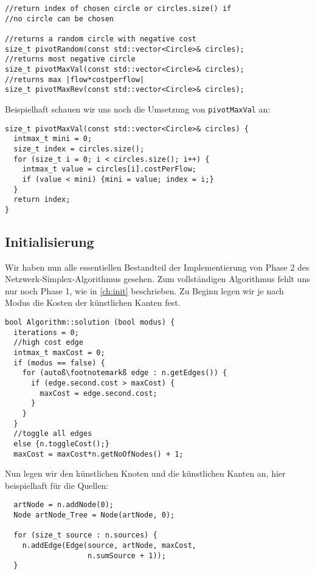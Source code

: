 \begin{lstlisting}
//return index of chosen circle or circles.size() if
//no circle can be chosen

//returns a random circle with negative cost
size_t pivotRandom(const std::vector<Circle>& circles);
//returns most negative circle
size_t pivotMaxVal(const std::vector<Circle>& circles);
//returns max |flow*costperflow|
size_t pivotMaxRev(const std::vector<Circle>& circles);
\end{lstlisting}

Beispielhaft schauen wir uns noch die Umsetzung von \lstinline|pivotMaxVal| an:

\begin{lstlisting}
size_t pivotMaxVal(const std::vector<Circle>& circles) {
  intmax_t mini = 0;
  size_t index = circles.size();
  for (size_t i = 0; i < circles.size(); i++) {
    intmax_t value = circles[i].costPerFlow;
    if (value < mini) {mini = value; index = i;}
  }
  return index;
}
\end{lstlisting}

\subsection{Initialisierung}\label{ch:HCLC}
Wir haben nun alle essentiellen Bestandteil der Implementierung von Phase 2 des Netzwerk-Simplex-Algorithmus gesehen. Zum vollständigen Algorithmus fehlt uns nur noch Phase 1, wie in \cref{ch:init} beschrieben. Zu Beginn legen wir je nach Modus die Kosten der künstlichen Kanten fest.

\begin{lstlisting}[escapechar=ß]
bool Algorithm::solution (bool modus) {
  iterations = 0;
  //high cost edge
  intmax_t maxCost = 0;
  if (modus == false) {
    for (autoß\footnotemarkß edge : n.getEdges()) {
      if (edge.second.cost > maxCost) {
        maxCost = edge.second.cost;
      }
    }
  }
  //toggle all edges
  else {n.toggleCost();}
  maxCost = maxCost*n.getNoOfNodes() + 1;
\end{lstlisting}


Nun legen wir den künstlichen Knoten und die künstlichen Kanten an, hier beispielhaft für die Quellen:
\begin{lstlisting}
  artNode = n.addNode(0);
  Node artNode_Tree = Node(artNode, 0);

  for (size_t source : n.sources) {
    n.addEdge(Edge(source, artNode, maxCost,
                   n.sumSource + 1));
  }
\end{lstlisting}

